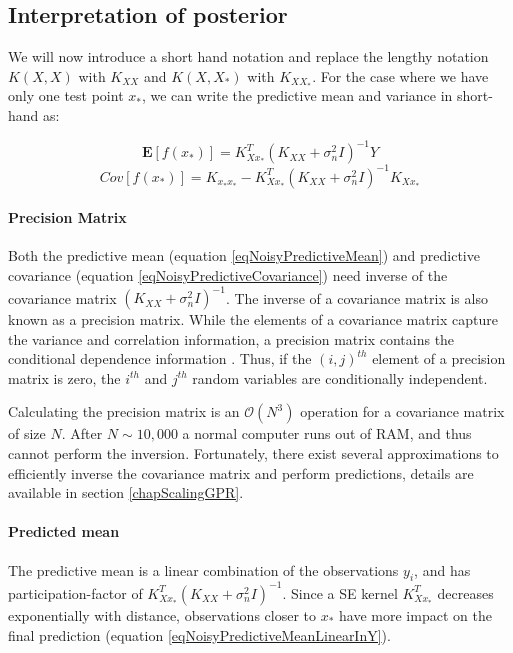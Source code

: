 \subsection{Interpretation of posterior}
We will now introduce a short hand notation and replace the lengthy notation $K(X, X)$ with $K_{XX}$ and $K(X, X_{*})$ with $K_{XX_{*}}$. For the case where we have only one test point $x_{*}$, we can write the predictive mean and variance in short-hand as:

  \begin{equation}\label{eqNoisyPredictiveMean}
  \mathbf{E}[f(x_{*})] = K_{Xx_{*}}^{T}( K_{XX} + \sigma^{2}_{n}I)^{-1}Y
  \end{equation}
  \begin{equation}\label{eqNoisyPredictiveCovariance}
	Cov[f(x_{*})] = K_{x_{*}x_{*}} - K_{Xx_{*}}^{T}( K_{XX} + \sigma^{2}_{n}I )^{-1} K_{Xx_{*}}
  \end{equation}

\paragraph{Precision Matrix}  
Both the predictive mean (equation \ref{eqNoisyPredictiveMean}) and predictive covariance (equation \ref{eqNoisyPredictiveCovariance}) need inverse of the covariance matrix $( K_{XX} + \sigma^{2}_{n}I)^{-1}$. The inverse of a covariance matrix is also known as a precision matrix. While the elements of a covariance matrix capture the variance and correlation information, a precision matrix contains the conditional dependence information \cite{mackay2003information}. Thus, if the $(i, j)^{th}$ element of a precision matrix is zero, the $i^{th}$ and $j^{th}$ random variables are conditionally independent. 

Calculating the precision matrix is an $\mathcal{O}\left ( N^{3} \right )$ operation for a covariance matrix of size $N$. After $N \sim 10,000$ a normal computer runs out of RAM, and thus cannot perform the inversion. Fortunately, there exist several approximations to efficiently inverse the covariance matrix and perform predictions, details are available in section \ref{chapScalingGPR}.

\paragraph{Predicted mean}
The predictive mean is a linear combination of the observations $y_{i}$, and has participation-factor of $K_{Xx_{*}}^{T}( K_{XX} + \sigma^{2}_{n}I)^{-1}$. Since a SE kernel $K_{Xx_{*}}^{T}$ decreases exponentially with distance, observations closer to $x_{*}$ have more impact on the final prediction (equation \ref{eqNoisyPredictiveMeanLinearInY}). 
  
